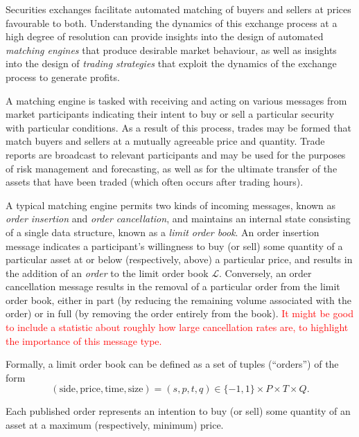 \documentclass[honours,12pt]{unswthesis}
\numberwithin{equation}{section}
\begin{document}
Securities exchanges facilitate automated matching of buyers and sellers at prices favourable to both. Understanding the dynamics of this exchange process at a high degree of resolution can provide insights into the design of automated \textit{matching engines} that produce desirable market behaviour, as well as insights into the design of \textit{trading strategies} that exploit the dynamics of the exchange process to generate profits.

A matching engine is tasked with receiving and acting on various messages from market participants indicating their intent to buy or sell a particular security with particular conditions. As a result of this process, trades may be formed that match buyers and sellers at a mutually agreeable price and quantity. Trade reports are broadcast to relevant participants and may be used for the purposes of risk management and forecasting, as well as for the ultimate transfer of the assets that have been traded (which often occurs after trading hours).

\bigskip

A typical matching engine permits two kinds of incoming messages, known as \textit{order insertion} and \textit{order cancellation}, and maintains an internal state consisting of a single data structure, known as a \textit{limit order book}.  An order insertion message indicates a participant's willingness to buy (or sell) some quantity of a particular asset at or below (respectively, above) a particular price, and results in the addition of an \textit{order} to the limit order book $\mathcal{L}$.  Conversely, an order cancellation message results in the removal of a particular order from the limit order book, either in part (by reducing the remaining volume associated with the order) or in full (by removing the order entirely from the book). \textcolor{red}{It might be good to include a statistic about roughly how large cancellation rates are, to highlight the importance of this message type.}

Formally, a limit order book can be defined as a set of tuples (``orders'') of the form
$$(\text{side},\text{price},\text{time},\text{size}) = (s,p,t,q)\in \{-1,1\}\times P\times T\times Q.$$

Each published order represents an intention to buy (or sell) some quantity of an asset at a maximum (respectively, minimum) price.
\end{document}
